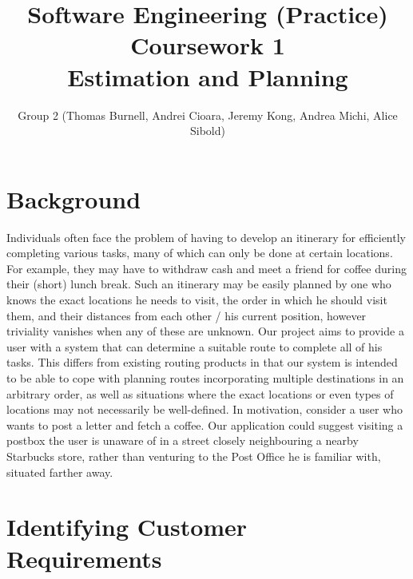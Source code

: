 \documentclass[10pt]{article}
\begin{document}
\title{Software Engineering (Practice) Coursework 1 \\ Estimation and Planning}
\author{Group 2 (Thomas Burnell, Andrei Cioara, Jeremy Kong, Andrea Michi, Alice Sibold)}
\maketitle

\section{Background}
Individuals often face the problem of having to develop an itinerary for efficiently completing various tasks, many of which can only be done at certain locations. For example, they may have to withdraw cash and meet a friend for coffee during their (short) lunch break. Such an itinerary may be easily planned by one who knows the exact locations he needs to visit, the order in which he should visit them, and their distances from each other / his current position, however triviality vanishes when any of these are unknown. Our project aims to provide a user with a system that can determine a suitable route to complete all of his tasks. This differs from existing routing products in that our system is intended to be able to cope with planning routes incorporating multiple destinations in an arbitrary order, as well as situations where the exact locations or even types of locations may not necessarily be well-defined. In motivation, consider a user who wants to post a letter and fetch a coffee. Our application could suggest visiting a postbox the user is unaware of in a street closely neighbouring a nearby Starbucks store, rather than venturing to the Post Office he is familiar with, situated farther away.

\section{Identifying Customer Requirements}
\end{document}
